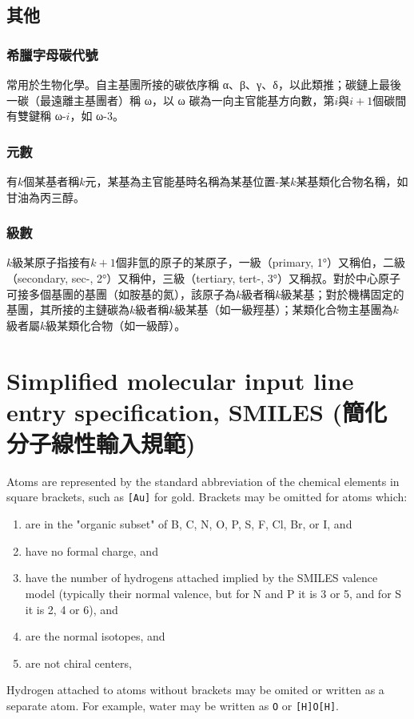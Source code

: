 \documentclass[a4paper,12pt]{report}
\begin{document}
\subsection{其他}
\subsubsection{希臘字母碳代號}
常用於生物化學。自主基團所接的碳依序稱 α、β、γ、δ，以此類推；碳鏈上最後一碳（最遠離主基團者）稱 ω，以 ω 碳為一向主官能基方向數，第$i$與$i+1$個碳間有雙鍵稱 ω-$i$，如 ω-3。
\subsubsection{元數}
有$k$個某基者稱$k$元，某基為主官能基時名稱為某基位置-某$k$某基類化合物名稱，如甘油為丙三醇。
\subsubsection{級數}
$k$級某原子指接有$k+1$個非氫的原子的某原子，一級（primary, 1°）又稱伯，二級（secondary, sec-, 2°）又稱仲，三級（tertiary, tert-, 3°）又稱叔。對於中心原子可接多個基團的基團（如胺基的氮），該原子為$k$級者稱$k$級某基；對於機構固定的基團，其所接的主鏈碳為$k$級者稱$k$級某基（如一級羥基）；某類化合物主基團為$k$級者屬$k$級某類化合物（如一級醇）。


\section{Simplified molecular input line entry specification, SMILES (簡化分子線性輸入規範)}
Atoms are represented by the standard abbreviation of the chemical elements in square brackets, such as \texttt{[Au]} for gold. Brackets may be omitted for atoms which:
\begin{enumerate}
\item are in the "organic subset" of B, C, N, O, P, S, F, Cl, Br, or I, and
\item have no formal charge, and
\item have the number of hydrogens attached implied by the SMILES valence model (typically their normal valence, but for N and P it is 3 or 5, and for S it is 2, 4 or 6), and
\item are the normal isotopes, and
\item are not chiral centers,
\end{enumerate}

Hydrogen attached to atoms without brackets may be omited or written as a separate atom. For example, water may be written as \texttt{O} or \texttt{[H]O[H]}.
\end{document}
